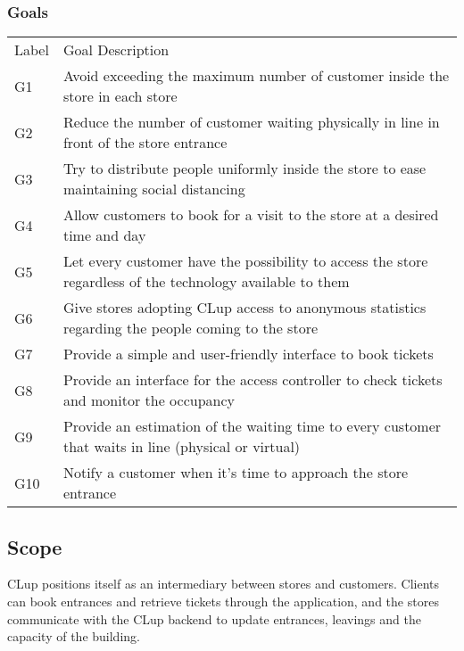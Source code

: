 \vfill

\pagebreak

\subsubsection{Goals}
\renewcommand{\arraystretch}{1.4}
\begin{tabular}{C{1cm}L{14.1cm}}
      Label & Goal Description                                                                                           \\
      G1    & Avoid exceeding the maximum number of customer inside the store in each store                              \\
      G2    & Reduce the number of customer waiting physically in line in front of the store entrance                    \\
      G3    & Try to distribute people uniformly inside the store to ease maintaining social distancing                  \\
      G4    & Allow customers to book for a visit to the store at a desired time and day                                 \\
      G5    & Let every customer have the possibility to access the store regardless of the technology available to them \\
      G6    & Give stores adopting CLup access to anonymous statistics regarding the people coming to the store          \\
      G7    & Provide a simple and user-friendly interface to book tickets                                               \\
      G8    & Provide an interface for the access controller to check tickets and monitor the occupancy                  \\
      G9    & Provide an estimation of the waiting time to every customer that waits in line (physical or virtual)       \\
      G10   & Notify a customer when it's time to approach the store entrance                                            \\
\end{tabular}

\subsection{Scope}
CLup positions itself as an intermediary between stores and customers. Clients can book entrances and retrieve tickets through the application, and the stores communicate with the CLup backend to update entrances, leavings and the capacity of the building.

